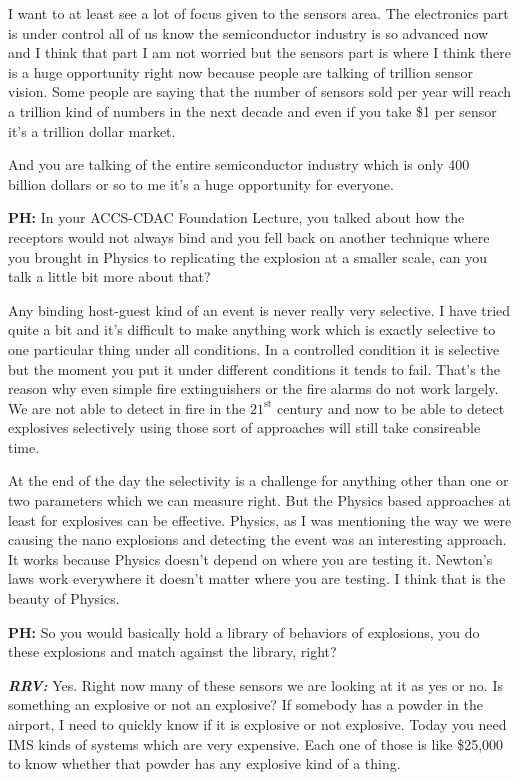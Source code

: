 I want to at least see a lot of focus given to the sensors area. The electronics part is under control all of us know the semiconductor industry is so advanced now and I think that part I am not worried but the sensors part is where I think there is a huge opportunity right now because people are talking of trillion sensor vision. Some people are saying that the number of sensors sold per year will reach a trillion kind of numbers in the next decade and even if you take \$1 per sensor it’s a trillion dollar market.

And you are talking of the entire semiconductor industry which is only 400 billion dollars or so to me it’s a huge opportunity for everyone.

\textbf{PH:} In your ACCS-CDAC Foundation Lecture, you talked about how the receptors would not always bind and you fell back on another technique where you brought in Physics to replicating the explosion at a smaller scale, can you talk a little bit more about that?

 Any binding host-guest kind of an event is never really very selective. I have tried quite a bit and it’s difficult to make anything work which is exactly selective to one particular thing under all conditions. In a controlled condition it is selective but the moment you put it under different conditions it tends to fail. That’s the reason why even simple fire extinguishers or the fire alarms do not work largely. We are not able to detect in fire in the $21^{\text{st}}$ century and now to be able to detect explosives selectively using those sort of approaches will still take consireable time.

At the end of the day the selectivity is a challenge for anything other than one or two parameters which we can measure right. But the Physics based approaches at least for explosives can be effective. Physics, as I was mentioning the way we were causing the nano explosions and detecting the event was an interesting approach. It works because Physics doesn’t depend on where you are testing it. Newton’s laws work everywhere it doesn’t matter where you are testing. I think that is the beauty of Physics.

\textbf{PH:} So you would basically hold a library of behaviors of explosions, you do these explosions and match against the library, right?

\textbf{\textit{RRV:}} Yes. Right now many of these sensors we are looking at it as yes or no. Is something an explosive or not an explosive? If somebody has a powder in the airport, I need to quickly know if it is explosive or not explosive. Today you need IMS kinds of systems which are very expensive. Each one of those is like \$25,000 to know whether that powder has any explosive kind of a thing.

